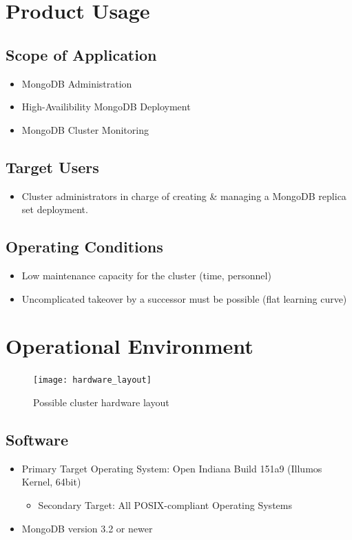\documentclass[a4paper, 11pt]{article}
\let\oldsection\section
\renewcommand\section{\clearpage\oldsection}
\begin{document}
\section{Product Usage}

\subsection{Scope of Application}
\begin{itemize}
\item \gls{MongoDB}  Administration
\item High-Availibility MongoDB Deployment
\item MongoDB Cluster Monitoring
\end{itemize}

\subsection{Target Users}
\begin{itemize}
\item Cluster \glspl{administrator} in charge of creating \& managing a MongoDB replica set deployment.
\end{itemize}

\subsection{Operating Conditions}
\begin{itemize}

\item Low maintenance capacity for the cluster (time, personnel)
\item Uncomplicated takeover by a successor must be possible (flat learning curve)
\end{itemize}

\section{Operational Environment}

\begin{figure}[H]
	\centering
	\texttt{[image: hardware\_layout]}
	\caption{Possible cluster hardware layout}
\end{figure}

\subsection{Software}\label{subsec:Software}
\begin{itemize}
\item Primary Target Operating System: Open Indiana Build 151a9 (Illumos Kernel, 64bit)
\begin{itemize}
	\item Secondary Target: All POSIX-compliant Operating Systems
\end{itemize}
\item MongoDB version 3.2 or newer
\end{itemize}
\end{document}
